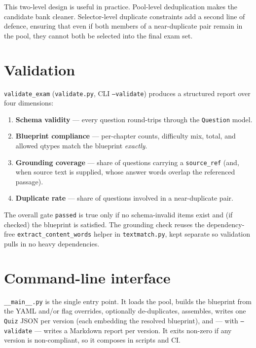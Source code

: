\documentclass[11pt,a4paper]{article}
\newcommand{\code}[1]{\texttt{\small #1}}
\newcommand{\pkg}[1]{\texttt{\small #1}}
\begin{document}
This two-level design is useful in practice. Pool-level deduplication makes the
candidate bank cleaner. Selector-level duplicate constraints add a second line
of defence, ensuring that even if both members of a near-duplicate pair remain
in the pool, they cannot both be selected into the final exam set.
\section{Validation}
\label{sec:validate}

\code{validate\_exam} (\pkg{validate.py}, CLI \code{--validate}) produces a
structured report over four dimensions:

\begin{enumerate}[nosep,leftmargin=1.6em]
  \item \textbf{Schema validity} --- every question round-trips through the
        \code{Question} model.
  \item \textbf{Blueprint compliance} --- per-chapter counts, difficulty mix,
        total, and allowed qtypes match the blueprint \emph{exactly}.
  \item \textbf{Grounding coverage} --- share of questions carrying a
        \code{source\_ref} (and, when source text is supplied, whose answer
        words overlap the referenced passage).
  \item \textbf{Duplicate rate} --- share of questions involved in a
        near-duplicate pair.
\end{enumerate}

The overall gate \code{passed} is true only if no schema-invalid items exist
and (if checked) the blueprint is satisfied. The grounding check reuses the
dependency-free \code{extract\_content\_words} helper in \pkg{textmatch.py},
kept separate so validation pulls in no heavy dependencies.

\section{Command-line interface}
\label{sec:cli}

\pkg{\_\_main\_\_.py} is the single entry point. It loads the pool, builds the
blueprint from the YAML and/or flag overrides, optionally de-duplicates,
assembles, writes one \code{Quiz} JSON per version (each embedding the resolved
blueprint), and --- with \code{--validate} --- writes a Markdown report per
version. It exits non-zero if any version is non-compliant, so it composes in
scripts and CI.
\end{document}
